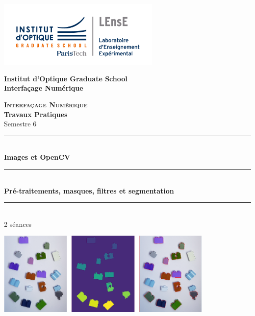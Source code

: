 \documentclass[a4paper,11pt,titlepage]{article} %
\begin{document}
\begin{titlepage}

\begin{center}
	\begin{minipage}{2.5cm}
	\begin{center}
		\includegraphics[width=8cm]{images/Logo-LEnsE.png}
	\end{center}
\end{minipage}\hfill
\begin{minipage}{10cm}
	\begin{center}
	\textbf{Institut d'Optique Graduate School }\\[0.1cm]
    \textbf{Interfaçage Numérique}


	\end{center}
\end{minipage}\hfill


\vspace{4cm}


{\huge \bfseries \textsc{Interfaçage Numérique}} \\[0.5cm]
{\large \bfseries Travaux Pratiques} \\[0.2cm]
Semestre 6

\vspace{1.5cm}
\rule{\linewidth}{0.3mm} \\[0.4cm]
{ \huge \bfseries\color{violet_iogs} Images et OpenCV \\[0.4cm] }
\rule{\linewidth}{0.3mm} \\[0.2cm]
{ \large \bfseries\color{violet_iogs} Pré-traitements, masques, filtres et segmentation }
\rule{\linewidth}{0.3mm} \\[1cm]

2 séances

\bigskip

\begin{center}
	\includegraphics[width=0.8\textwidth]{images/trait_image.png}
\end{center}


\end{center}
\end{titlepage}
\end{document}
